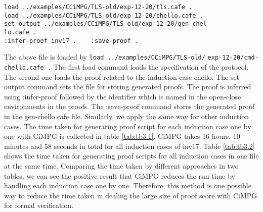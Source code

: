 \documentclass[a4paper,fleqn]{cas-dc}
\begin{document}
\begin{verbatim}
load ../examples/CCiMPG/TLS-old/exp-12-20/tls.cafe .
load ../examples/CCiMPG/TLS-old/exp-12-20/chello.cafe .
set-output ../examples/CCiMPG/TLS-old/exp-12-20/gen-chel
lo.cafe .
:infer-proof inv17 .    :save-proof .
\end{verbatim}
The above file is loaded by \verb!load ../examples/CCiMPG/TLS-old/!
\verb!exp-12-20/cmd-chello.cafe .! The first load command loads the specification of the protocol. The second one loads the proof related to the induction case chello. The set-output command sets the file for storing generated proofs. The proof is inferred using :infer-proof followed by the identifier which is named in the open-close environments in the proofs. The :save-proof command stores the generated proof in the gen-chello.cafe file. Similarly, we apply the same way for other induction cases. The time taken for generating proof script for each induction case one by one with CiMPG is collected in table \ref{tab:tb3.1}. CiMPG takes 16 hours, 10 minutes and 58 seconds in total for all induction cases of inv17. Table \ref{tab:tb3.2} shows the time taken for generating proof scripts for all induction cases in one file at the same time. Comparing the time taken by different approaches in two tables, we can see the positive result that CiMPG reduces the run time by handling each induction case one by one. Therefore, this method is one possible way to reduce the time taken in dealing the large size of proof score with CiMPG for formal verification. 
\newline
\end{document}
